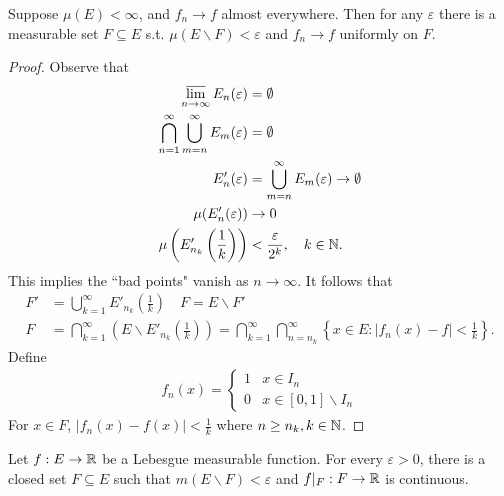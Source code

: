 \documentclass[class=book, crop=false]{standalone}
\begin{document}
        \begin{theorem}
            Suppose $\mu(E) < \infty$, and $f_n \rightarrow f$ almost everywhere. Then for any $\varepsilon$ there is a measurable set $F \subseteq E$ s.t. $\mu(E \backslash F) < \varepsilon$ and $f_n \rightarrow f$ uniformly on $F$.
        \end{theorem}
        \begin{proof}
            Observe that
            \begin{align*}
                \varlimsup_{n \rightarrow \infty} E_n(\varepsilon) &= \emptyset \\
                \bigcap^{\infty}_{n = 1} \bigcup^{\infty}_{m = n} E_m(\varepsilon) &= \emptyset \\
                E'_n(\varepsilon) &= \bigcup^{\infty}_{m = n} E_m(\varepsilon) \rightarrow \emptyset \\
                \mu(E'_n(\varepsilon)) &\rightarrow 0 \\
                \mu\left(E'_{n_k}\left(\frac{1}{k}\right)\right) &< \frac{\varepsilon}{2^k}, \quad k \in \mathbb{N}.
            \end{align*}
            This implies the ``bad points" vanish as $n \rightarrow \infty$. It follows that
            \begin{align*}
                F' &= \bigcup^{\infty}_{k = 1} E'_{n_k}\left(\frac{1}{k}\right) \quad F = E \backslash F' \\
                F &= \bigcap^{\infty}_{k = 1} \left(E \backslash E'_{n_k}\left(\frac{1}{k}\right)\right) = \bigcap^{\infty}_{k = 1} \bigcap^{\infty}_{n = n_k} \left\{x \in E : |f_n(x) - f| < \frac{1}{k}\right\}.
            \end{align*}
            Define
            \begin{align*}
                f_n(x) = \begin{cases}
                    1 & x \in I_n \\
                    0 & x \in [0, 1] \backslash I_n
                \end{cases}
            \end{align*}
            For $x \in F$, $|f_n(x) - f(x)| < \frac{1}{k}$ where $n \geq n_k, k \in \mathbb{N}$.
        \end{proof}

        \begin{theorem}
            Let $f : E \rightarrow \mathbb{R}$ be a Lebesgue measurable function. For every $\varepsilon > 0$, there is a closed set $F \subseteq E$ such that $m(E \backslash F) < \varepsilon$ and $f|_F : F \rightarrow \mathbb{R}$ is continuous.
        \end{theorem}
\end{document}
